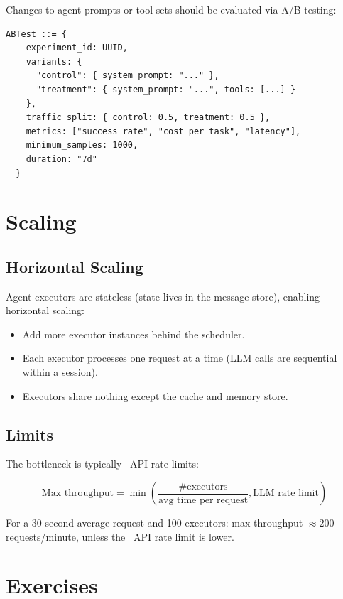 Changes to agent prompts or tool sets should be evaluated via A/B testing:

\begin{lstlisting}[caption=A/B test configuration]
  ABTest ::= {
    experiment_id: UUID,
    variants: {
      "control": { system_prompt: "..." },
      "treatment": { system_prompt: "...", tools: [...] }
    },
    traffic_split: { control: 0.5, treatment: 0.5 },
    metrics: ["success_rate", "cost_per_task", "latency"],
    minimum_samples: 1000,
    duration: "7d"
  }
\end{lstlisting}

\section{Scaling}

\subsection{Horizontal Scaling}

Agent executors are stateless (state lives in the message store), enabling horizontal scaling:

\begin{itemize}
	\item Add more executor instances behind the scheduler.
	\item Each executor processes one request at a time (LLM calls are sequential within a session).
	\item Executors share nothing except the cache and memory store.
\end{itemize}

\subsection{Limits}

The bottleneck is typically \llm\ API rate limits:

\begin{equation}
	\text{Max throughput} = \min\left(\frac{\text{\# executors}}{\text{avg time per request}}, \text{LLM rate limit}\right)
\end{equation}

For a 30-second average request and 100 executors: max throughput $\approx 200$ requests/minute, unless the \llm\ API rate limit is lower.

\section{Exercises}

